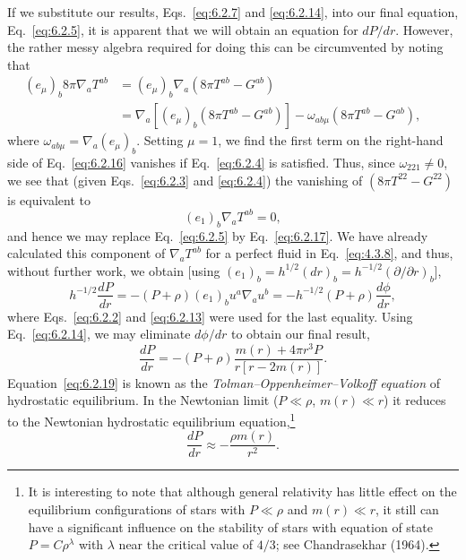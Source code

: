 If we substitute our results, Eqs.~\eqref{eq:6.2.7} and \eqref{eq:6.2.14}, into
our final equation, Eq.~\eqref{eq:6.2.5}, it is apparent that we will obtain an
equation for \(dP/dr\). However, the rather messy algebra required for doing this
can be circumvented by noting that
\begin{align}
  (e_\mu)_b8\pi\nabla_aT^{ab}
    &=(e_\mu)_b\nabla_a(8\pi T^{ab}-G^{ab})\nonumber\\
    &=\nabla_a\left[(e_\mu)_b(8\pi T^{ab}-G^{ab})\right]
      -\omega_{ab\mu}(8\pi T^{ab}-G^{ab}),
  &&\tag{6.2.16}\label{eq:6.2.16}
\end{align}
where \(\omega_{ab\mu}=\nabla_a(e_\mu)_b\). Setting \(\mu=1\), we find the first
term on the right-hand side of Eq.~\eqref{eq:6.2.16} vanishes if
Eq.~\eqref{eq:6.2.4} is satisfied. Thus, since \(\omega_{221}\ne0\), we see that
(given Eqs.~\eqref{eq:6.2.3} and \eqref{eq:6.2.4}) the vanishing of
\((8\pi T^{22}-G^{22})\) is equivalent to
\begin{equation}
  (e_1)_b\nabla_aT^{ab}=0,
  \tag{6.2.17}\label{eq:6.2.17}
\end{equation}
and hence we may replace Eq.~\eqref{eq:6.2.5} by Eq.~\eqref{eq:6.2.17}. We have
already calculated this component of \(\nabla_aT^{ab}\) for a perfect fluid in
Eq.~\eqref{eq:4.3.8}, and thus, without further work, we obtain [using
\((e_1)_b=h^{1/2}(dr)_b=h^{-1/2}(\partial/\partial r)_b\)],
\begin{equation}
  h^{-1/2}\frac{dP}{dr}
  =-(P+\rho)(e_1)_bu^a\nabla_au^b
  =-h^{-1/2}(P+\rho)\frac{d\phi}{dr},
  \tag{6.2.18}\label{eq:6.2.18}
\end{equation}
where Eqs.~\eqref{eq:6.2.2} and \eqref{eq:6.2.13} were used for the last
equality. Using Eq.~\eqref{eq:6.2.14}, we may eliminate \(d\phi/dr\) to obtain
our final result,
\begin{equation}
  \frac{dP}{dr}=-(P+\rho)\frac{m(r)+4\pi r^3P}{r[r-2m(r)]}.
  \tag{6.2.19}\label{eq:6.2.19}
\end{equation}
Equation~\eqref{eq:6.2.19} is known as the
\emph{Tolman--Oppenheimer--Volkoff equation} of hydrostatic equilibrium. In the
Newtonian limit (\(P\ll\rho\), \(m(r)\ll r\)) it reduces to the Newtonian
hydrostatic equilibrium equation,\footnote{It is interesting to note that
although general relativity has little effect on the equilibrium configurations
of stars with \(P\ll\rho\) and \(m(r)\ll r\), it still can have a significant
influence on the stability of stars with equation of state \(P=C\rho^\lambda\)
with \(\lambda\) near the critical value of \(4/3\); see Chandrasekhar (1964).}
\begin{equation}
  \frac{dP}{dr}\approx-\frac{\rho m(r)}{r^2}.
  \tag{6.2.20}\label{eq:6.2.20}
\end{equation}

